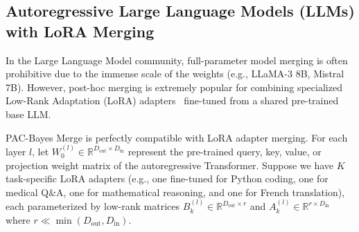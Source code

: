 \subsection{Autoregressive Large Language Models (LLMs) with LoRA Merging}
In the Large Language Model community, full-parameter model merging is often prohibitive due to the immense scale of the weights (e.g., LLaMA-3 8B, Mistral 7B). However, post-hoc merging is extremely popular for combining specialized Low-Rank Adaptation (LoRA) adapters~\cite{hu2021lora} fine-tuned from a shared pre-trained base LLM.

PAC-Bayes Merge is perfectly compatible with LoRA adapter merging. For each layer $l$, let $W_0^{(l)} \in \mathbb{R}^{D_{\text{out}} \times D_{\text{in}}}$ represent the pre-trained query, key, value, or projection weight matrix of the autoregressive Transformer. Suppose we have $K$ task-specific LoRA adapters (e.g., one fine-tuned for Python coding, one for medical Q\&A, one for mathematical reasoning, and one for French translation), each parameterized by low-rank matrices $B_k^{(l)} \in \mathbb{R}^{D_{\text{out}} \times r}$ and $A_k^{(l)} \in \mathbb{R}^{r \times D_{\text{in}}}$ where $r \ll \min(D_{\text{out}}, D_{\text{in}})$.

